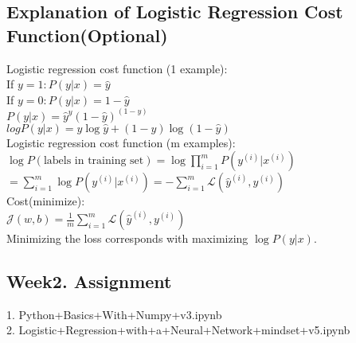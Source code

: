 \documentclass{article}
\begin{document}
\newpage
\subsection{Explanation of Logistic Regression Cost Function(Optional)}


Logistic regression cost function (1 example):\\

If $y=1: P(y|x) = \hat{y}$\\
If $y=0: P(y|x) = 1- \hat{y}$\\

$P(y|x) = \hat{y} ^{y} (1-\hat{y})^{(1-y)}$\\

$log P(y|x) = y \log \hat{y} + (1-y) \log (1-\hat{y})$\\


Logistic regression cost function (m examples):\\

$\log P(\text{labels in training set}) = \log \prod_{i=1}^{m} P(y^{(i)}|x^{(i)})$\\

$= \sum_{i=1}^{m} \log P(y^{(i)}|x^{(i)})  = -\sum_{i=1}^{m}\mathcal{L}(\hat{y}^{(i)},y^{(i)})$\\

Cost(minimize):\\

$\mathcal{J}(w,b) = \frac{1}{m} \sum_{i=1}^{m}\mathcal{L}(\hat{y}^{(i)}, y^{(i)})$\\

Minimizing the loss corresponds with maximizing $\log P(y|x)$.\\


\newpage
\subsection{Week2. Assignment}

1. Python+Basics+With+Numpy+v3.ipynb\\
2. Logistic+Regression+with+a+Neural+Network+mindset+v5.ipynb\\
\end{document}
